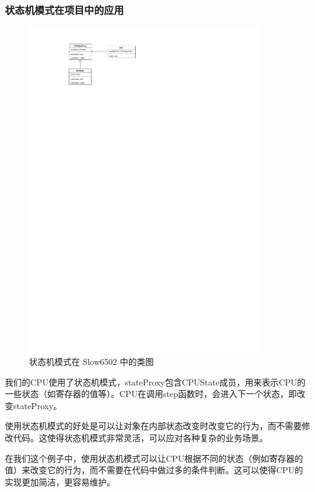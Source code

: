 \subsubsection{状态机模式在项目中的应用}

\begin{figure}[h]
    \centering
    \includegraphics[width=0.9\textwidth]{figures/State.pdf}
    \caption{状态机模式在 Slow6502 中的类图}
\end{figure}

我们的CPU使用了状态机模式，stateProxy包含CPUState成员，用来表示CPU的一些状态（如寄存器的值等）。CPU在调用step函数时，会进入下一个状态，即改变stateProxy。

使用状态机模式的好处是可以让对象在内部状态改变时改变它的行为，而不需要修改代码。这使得状态机模式非常灵活，可以应对各种复杂的业务场景。

在我们这个例子中，使用状态机模式可以让CPU根据不同的状态（例如寄存器的值）来改变它的行为，而不需要在代码中做过多的条件判断。这可以使得CPU的实现更加简洁，更容易维护。

  